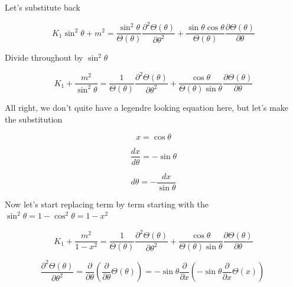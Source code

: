 \documentclass[12pt]{article}
\renewcommand{\_}{\kern-1.5pt\textunderscore\kern-1.5pt}
\begin{document}
Let’s substitute back\par

 \[ K_{1}\sin ^{2} \theta +m^{2}=\frac{\sin ^{2} \theta }{ \Theta  \left(  \theta  \right) }\frac{ \partial ^{2} \Theta  \left(  \theta  \right) }{ \partial  \theta ^{2}}+\frac{\sin  \theta \cos  \theta }{ \Theta  \left(  \theta  \right) }\frac{ \partial  \Theta  \left(  \theta  \right) }{ \partial  \theta } \] \par

Divide throughout by  \( \sin ^{2} \theta  \) \par

 \[ K_{1}+\frac{m^{2}}{\sin ^{2} \theta }=\frac{1}{ \Theta  \left(  \theta  \right) }\frac{ \partial ^{2} \Theta  \left(  \theta  \right) }{ \partial  \theta ^{2}}+\frac{\cos  \theta }{ \Theta  \left(  \theta  \right) \sin  \theta }\frac{ \partial  \Theta  \left(  \theta  \right) }{ \partial  \theta } \] \par

All right, we don’t quite have a legendre looking equation here, but let’s make the substitution \par

 \[ x=\cos  \theta  \] \par

 \[ \frac{dx}{d \theta }=-\sin  \theta  \] \par

 \[ d \theta =-\frac{dx}{\sin  \theta } \] \par

Now let’s start replacing term by term starting with the  \( \sin ^{2} \theta =1-\cos ^{2} \theta =1-x^{2} \) \par

 \[ K_{1}+\frac{m^{2}}{1-x^{2}}=\frac{1}{ \Theta  \left(  \theta  \right) }\frac{ \partial ^{2} \Theta  \left(  \theta  \right) }{ \partial  \theta ^{2}}+\frac{\cos  \theta }{ \Theta  \left(  \theta  \right) \sin  \theta }\frac{ \partial  \Theta  \left(  \theta  \right) }{ \partial  \theta } \] \par


\vspace{\baselineskip}
 \[ \frac{ \partial ^{2} \Theta  \left(  \theta  \right) }{ \partial  \theta ^{2}}=\frac{ \partial }{ \partial  \theta } \left( \frac{ \partial }{ \partial  \theta } \Theta  \left(  \theta  \right)  \right) =-\sin  \theta \frac{ \partial }{ \partial x} \left( -\sin  \theta \frac{ \partial }{ \partial x} \Theta  \left( x \right)  \right) ~ \] \par
\end{document}
